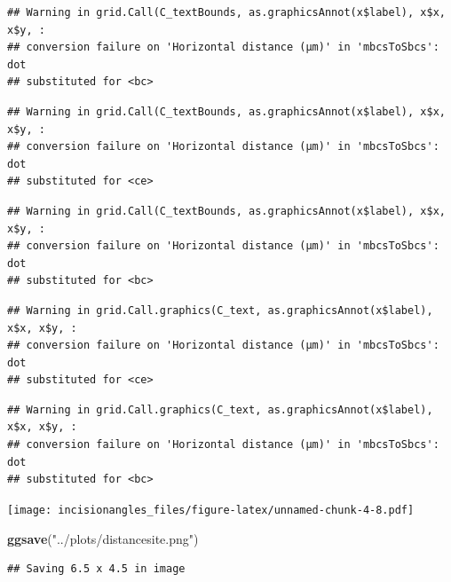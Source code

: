 \documentclass[
]{article}
\newenvironment{Shaded}{\begin{snugshade}}{\end{snugshade}}
\newcommand{\FunctionTok}[1]{\textcolor[rgb]{0.13,0.29,0.53}{\textbf{#1}}}
\newcommand{\NormalTok}[1]{#1}
\newcommand{\StringTok}[1]{\textcolor[rgb]{0.31,0.60,0.02}{#1}}
\begin{document}
\begin{verbatim}
## Warning in grid.Call(C_textBounds, as.graphicsAnnot(x$label), x$x, x$y, :
## conversion failure on 'Horizontal distance (μm)' in 'mbcsToSbcs': dot
## substituted for <bc>
\end{verbatim}

\begin{verbatim}
## Warning in grid.Call(C_textBounds, as.graphicsAnnot(x$label), x$x, x$y, :
## conversion failure on 'Horizontal distance (μm)' in 'mbcsToSbcs': dot
## substituted for <ce>
\end{verbatim}

\begin{verbatim}
## Warning in grid.Call(C_textBounds, as.graphicsAnnot(x$label), x$x, x$y, :
## conversion failure on 'Horizontal distance (μm)' in 'mbcsToSbcs': dot
## substituted for <bc>
\end{verbatim}

\begin{verbatim}
## Warning in grid.Call.graphics(C_text, as.graphicsAnnot(x$label), x$x, x$y, :
## conversion failure on 'Horizontal distance (μm)' in 'mbcsToSbcs': dot
## substituted for <ce>
\end{verbatim}

\begin{verbatim}
## Warning in grid.Call.graphics(C_text, as.graphicsAnnot(x$label), x$x, x$y, :
## conversion failure on 'Horizontal distance (μm)' in 'mbcsToSbcs': dot
## substituted for <bc>
\end{verbatim}

\texttt{[image: incisionangles\_files/figure-latex/unnamed-chunk-4-8.pdf]}

\begin{Shaded}
\begin{Highlighting}[]
\FunctionTok{ggsave}\NormalTok{(}\StringTok{"../plots/distancesite.png"}\NormalTok{)}
\end{Highlighting}
\end{Shaded}

\begin{verbatim}
## Saving 6.5 x 4.5 in image
\end{verbatim}
\end{document}
